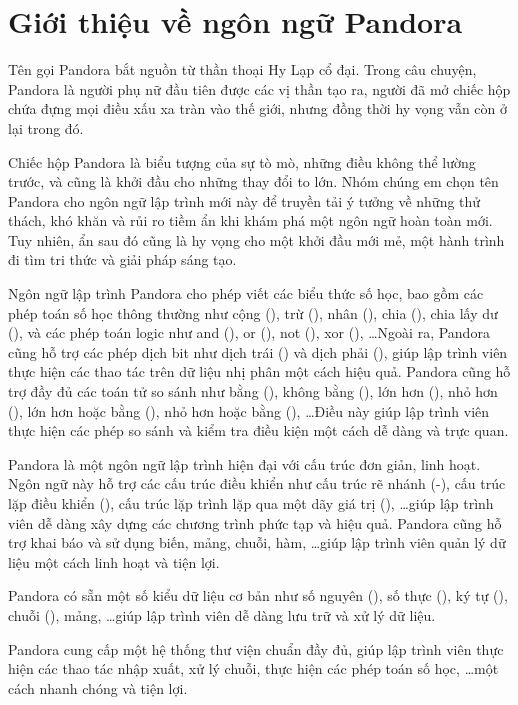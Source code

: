 \section{Giới thiệu về ngôn ngữ Pandora}
    Tên gọi Pandora bắt nguồn từ thần thoại Hy Lạp cổ đại. Trong câu chuyện, Pandora là người phụ nữ đầu tiên được các vị thần tạo ra, người đã mở chiếc hộp chứa đựng mọi điều xấu xa tràn vào thế giới, nhưng đồng thời hy vọng vẫn còn ở lại trong đó.

    Chiếc hộp Pandora là biểu tượng của sự tò mò, những điều không thể lường trước, và cũng là khởi đầu cho những thay đổi to lớn. Nhóm chúng em chọn tên Pandora cho ngôn ngữ lập trình mới này để truyền tải ý tưởng về những thử thách, khó khăn và rủi ro tiềm ẩn khi khám phá một ngôn ngữ hoàn toàn mới. Tuy nhiên, ẩn sau đó cũng là hy vọng cho một khởi đầu mới mẻ, một hành trình đi tìm tri thức và giải pháp sáng tạo.

    Ngôn ngữ lập trình Pandora cho phép viết các biểu thức số học, bao gồm các phép toán số học thông thường như cộng (\kw{+}), trừ (\kw{-}), nhân (\kw{*}), chia (\kw{/}), chia lấy dư (\kw{\%}), và các phép toán logic như and (\kw{\&}), or (\kw{|}), not (\kw{!}), xor (\kw{\^}), \dots Ngoài ra, Pandora cũng hỗ trợ các phép dịch bit như dịch trái (\kw{<}\kw{<}) và dịch phải (\kw{>}\kw{>}), giúp lập trình viên thực hiện các thao tác trên dữ liệu nhị phân một cách hiệu quả. Pandora cũng hỗ trợ đầy đủ các toán tử so sánh như bằng (\kw{==}), không bằng (\kw{!=}), lớn hơn (\kw{>}), nhỏ hơn (\kw{<}), lớn hơn hoặc bằng (\kw{>=}), nhỏ hơn hoặc bằng (\kw{<=}), \dots Điều này giúp lập trình viên thực hiện các phép so sánh và kiểm tra điều kiện một cách dễ dàng và trực quan.

    Pandora là một ngôn ngữ lập trình hiện đại với cấu trúc đơn giản, linh hoạt. Ngôn ngữ này hỗ trợ các cấu trúc điều khiển như cấu trúc rẽ nhánh (-), cấu trúc lặp điều khiển (), cấu trúc lặp trình lặp qua một dãy giá trị (), \dots giúp lập trình viên dễ dàng xây dựng các chương trình phức tạp và hiệu quả. Pandora cũng hỗ trợ khai báo và sử dụng biến, mảng, chuỗi, hàm, \dots giúp lập trình viên quản lý dữ liệu một cách linh hoạt và tiện lợi.

    Pandora có sẵn một số kiểu dữ liệu cơ bản như số nguyên (), số thực (), ký tự (), chuỗi (), mảng, \dots giúp lập trình viên dễ dàng lưu trữ và xử lý dữ liệu.

    Pandora cung cấp một hệ thống thư viện chuẩn đầy đủ, giúp lập trình viên thực hiện các thao tác nhập xuất, xử lý chuỗi, thực hiện các phép toán số học, \dots một cách nhanh chóng và tiện lợi.


